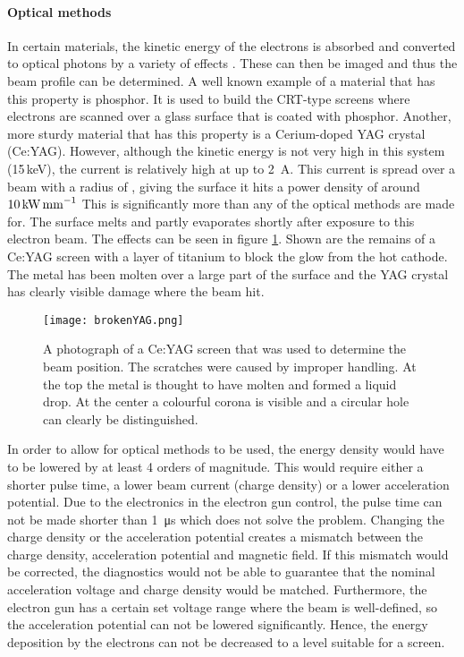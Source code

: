 \paragraph{Optical methods}
In certain materials, the kinetic energy of the electrons is absorbed and converted to optical photons by a variety of effects . These can then be imaged and thus the beam profile can be determined. A well known example of a material that has this property is phosphor. It is used to build the CRT-type screens where electrons are scanned over a glass surface that is coated with phosphor.
Another, more sturdy material that has this property is a Cerium-doped YAG crystal (Ce:YAG). 
However, although the kinetic energy is not very high in this system (15\,keV), the current is relatively high at up to \SI{2}{\ampere}. This current is spread over a beam with a radius of , giving the surface it hits a power density of around $10\,\text{kW\,mm}^{-1}$
This is significantly more than any of the optical methods are made for. The surface melts and partly evaporates shortly after exposure to this electron beam. 
The effects can be seen in figure \ref{fig:brokenyag}. Shown are the remains of a Ce:YAG screen with a layer of titanium to block the glow from the hot cathode. The metal has been molten over a large part of the surface and the YAG crystal has clearly visible damage where the beam hit. 
\begin{figure}[h]
 \centering
 \texttt{[image: brokenYAG.png]}
 \caption{A photograph of a Ce:YAG screen that was used to determine the beam position. The scratches were caused by improper handling. At the top the metal is thought to have molten and formed a liquid drop. At the center a colourful corona is visible and a circular hole can clearly be distinguished.}
 \label{fig:brokenyag}
\end{figure}

In order to allow for optical methods to be used, the energy density would have to be lowered by at least 4 orders of magnitude. 
This would require either a shorter pulse time, a lower beam current (charge density) or a lower acceleration potential.
Due to the electronics in the electron gun control, the pulse time can not be made shorter than \SI{1}{\micro\second} which does not solve the problem. 
Changing the charge density or the acceleration potential creates a mismatch between the charge density, acceleration potential and magnetic field. If this mismatch would be corrected, the diagnostics would not be able to guarantee that the nominal acceleration voltage and charge density would be matched.
Furthermore, the electron gun has a certain set voltage range where the beam is well-defined, so the acceleration potential can not be lowered significantly.
Hence, the energy deposition by the electrons can not be decreased to a level suitable for a screen.

